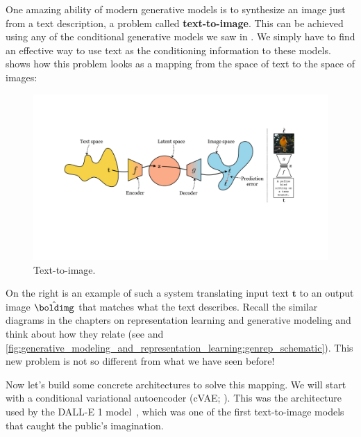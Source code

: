 One amazing ability of modern generative models is to synthesize an image just from a text description, a problem called \textbf{text-to-image}. This can be achieved using any of the conditional generative models we saw in \chap{\ref{chapter:conditional_generative_models}}. We simply have to find an effective way to use text as the conditioning information to these models. \Fig{\ref{fig:vision_and_language:text2im_schematic_mapping}} shows how this problem looks as a mapping from the space of text to the space of images:
\begin{figure}[h]
    \centerline{
        \includegraphics[width=1.0\linewidth]{figures/vision_and_language/text2im_schematic_mapping.pdf}}
    \caption{Text-to-image.}
    \label{fig:vision_and_language:text2im_schematic_mapping}
\end{figure}

On the right is an example of such a system translating input text $\mathbf{t}$ to an output image $\hat{\boldimg}$ that matches what the text describes. Recall the similar diagrams in the chapters on representation learning and generative modeling and think about how they relate (see \figs{\ref{fig:representation_learning:autoencoder_diagram}} and \ref{fig:generative_modeling_and_representation_learning:genrep_schematic}). This new problem is not so different from what we have seen before!

Now let's build some concrete architectures to solve this mapping. We will start with a conditional variational autoencoder (cVAE; \sect{\ref{sec:conditional_generative_models:cVAE}}). This was the architecture used by the DALL-E 1 model~\cite{dalle1}, which was one of the first text-to-image models that caught the public's imagination.

